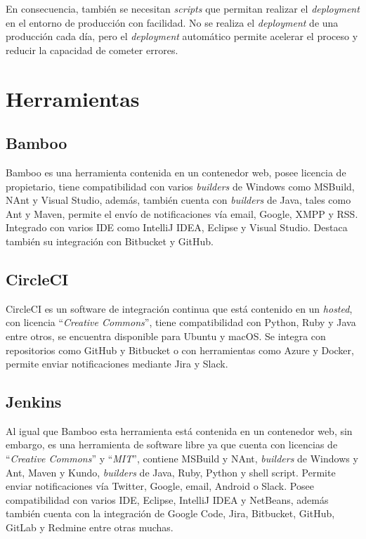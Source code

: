 \begin{enumerate}
En consecuencia, también se necesitan \textit{scripts} que permitan realizar el \textit{deployment} en el entorno de producción con facilidad. No se realiza el \textit{deployment} de una producción cada día, pero el \textit{deployment} automático permite acelerar el proceso y reducir la capacidad de cometer errores.


\end{enumerate}


\section{Herramientas}

\subsection{Bamboo}

Bamboo es una herramienta contenida en un contenedor web, posee licencia de propietario, tiene compatibilidad con varios \textit{builders} de Windows como MSBuild, NAnt y Visual Studio, además, también cuenta con \textit{builders} de Java, tales como Ant y Maven, permite el envío de notificaciones vía email, Google, XMPP y RSS. Integrado con varios \ac{IDE} como IntelliJ IDEA, Eclipse y Visual Studio. Destaca también su integración con Bitbucket y GitHub.

\subsection{CircleCI}

CircleCI\cite{CircleCI} es un software de integración continua que está contenido en un \textit{hosted}, con licencia ``\textit{Creative Commons}'', tiene compatibilidad con Python, Ruby y Java entre otros, se encuentra disponible para Ubuntu y macOS. Se integra con repositorios como GitHub y Bitbucket o con herramientas como Azure y Docker, permite enviar notificaciones mediante Jira y Slack.

\subsection{Jenkins}

Al igual que Bamboo esta herramienta está contenida en un contenedor web, sin embargo, es una herramienta de software libre ya que cuenta con licencias de “\textit{Creative Commons}” y “\textit{MIT}”, contiene MSBuild y NAnt, \textit{builders} de Windows y Ant, Maven y Kundo, \textit{builders} de Java, Ruby, Python y shell script. Permite enviar notificaciones vía Twitter, Google, email, Android o Slack. Posee compatibilidad con varios \ac{IDE}, Eclipse, IntelliJ IDEA y NetBeans, además también cuenta con la integración de Google Code, Jira, Bitbucket, GitHub, GitLab y Redmine entre otras muchas.

